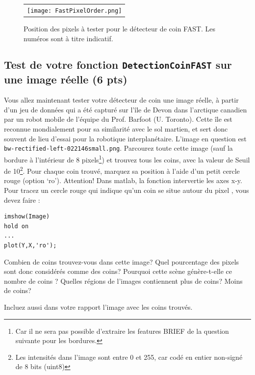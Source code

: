 \documentclass[12pt]{article}
\begin{document}
\begin{figure}[ht]
 \begin{center}
  \begin{tabular}{c}
    \texttt{[image: FastPixelOrder.png]}
  \end{tabular}
 \end{center}
\vspace{-0.25in}
 \caption{Position des pixels à tester pour le détecteur de coin FAST. Les numéros sont à titre indicatif.}
 \label{FastPixelOrder}
\end{figure}

\subsection{Test de votre fonction \texttt{DetectionCoinFAST} sur une image réelle (6 pts)}
Vous allez maintenant tester votre détecteur de coin une image réelle, à partir d'un jeu de données qui a été capturé sur l'île de Devon dans l'arctique canadien par un robot mobile de l'équipe du Prof.
Barfoot (U. Toronto). Cette île est reconnue mondialement pour sa similarité avec le sol martien, et sert donc souvent de lieu d'essai pour la robotique interplanétaire.
L'image en question est \texttt{bw-rectified-left-022146small.png}.
Parcourez toute cette image (sauf la bordure à l'intérieur de 8 pixels\footnote{Car il ne sera pas possible d'extraire les features BRIEF de la question suivante pour les bordures.}) et trouvez tous les coins, avec la valeur de {Seuil} de 10\footnote{Les intensités dans l'image sont entre 0 et 255, car codé en entier non-signé de 8 bits ({uint8})}.
Pour chaque coin trouvé, marquez sa position à l'aide d'un petit cercle rouge (option {`ro'}).
Attention! Dans matlab, la fonction  intervertie les axes x-y.
Pour tracez un cercle rouge qui indique qu'un coin se situe autour du pixel , vous devez faire :
\vspace{-0.22in}
\begin{lstlisting}
imshow(Image)
hold on
...
plot(Y,X,'ro');
\end{lstlisting}
Combien de coins trouvez-vous dans cette image? Quel pourcentage des pixels sont donc considérés comme des coins? Pourquoi cette scène génère-t-elle ce nombre de coins ? Quelles régions de l'images contiennent plus de coins? Moins de coins?

Incluez aussi dans votre rapport l'image avec les coins trouvés.


\end{document}
